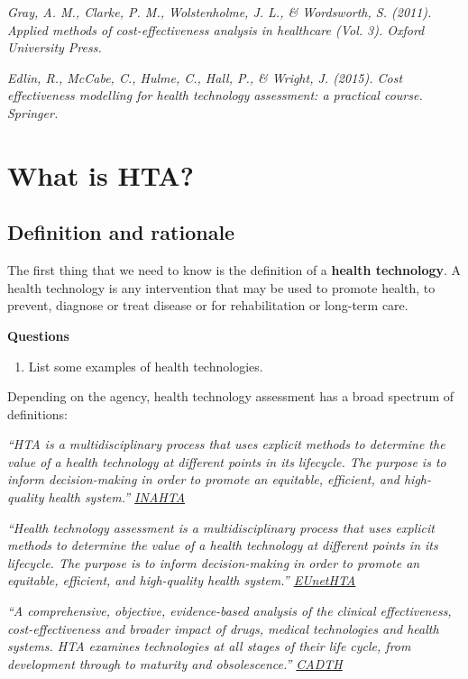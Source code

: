 \documentclass[
]{book}
\providecommand{\tightlist}{%
  \setlength{\itemsep}{0pt}\setlength{\parskip}{0pt}}
\begin{document}
\emph{Gray, A. M., Clarke, P. M., Wolstenholme, J. L., \& Wordsworth, S. (2011). Applied methods of cost-effectiveness analysis in healthcare (Vol. 3). Oxford University Press.}

\emph{Edlin, R., McCabe, C., Hulme, C., Hall, P., \& Wright, J. (2015). Cost effectiveness modelling for health technology assessment: a practical course. Springer.}

\hypertarget{HTA}{%
\chapter{What is HTA?}\label{HTA}}

\hypertarget{definition-and-rationale}{%
\section{Definition and rationale}\label{definition-and-rationale}}

The first thing that we need to know is the definition of a \textbf{health technology}. A health technology is any intervention that may be used to promote health, to prevent, diagnose or treat disease or for rehabilitation or long-term care.

\textbf{Questions}

\begin{enumerate}
\def\labelenumi{\arabic{enumi}.}
\tightlist
\item
  List some examples of health technologies.
\end{enumerate}

Depending on the agency, health technology assessment has a broad spectrum of definitions:

\emph{``HTA is a multidisciplinary process that uses explicit methods to determine the value of a health technology at different points in its lifecycle. The purpose is to inform decision-making in order to promote an equitable, efficient, and high-quality health system.'' \href{https://www.inahta.org/}{INAHTA}}

\emph{``Health technology assessment is a multidisciplinary process that uses explicit methods to determine the value of a health technology at different points in its lifecycle. The purpose is to inform decision-making in order to promote an equitable, efficient, and high-quality health system.'' \href{https://www.eunethta.eu/}{EUnetHTA}}

\emph{``A comprehensive, objective, evidence-based analysis of the clinical effectiveness, cost-effectiveness and broader impact of drugs, medical technologies and health systems. HTA examines technologies at all stages of their life cycle, from development through to maturity and obsolescence.'' \href{https://www.cadth.ca}{CADTH}}
\end{document}
